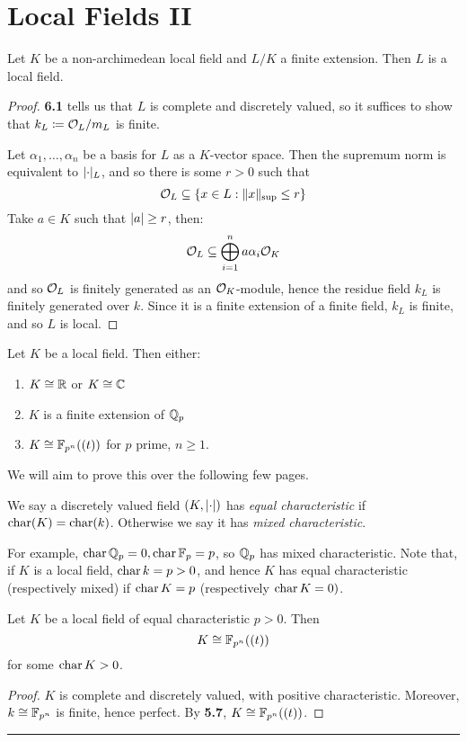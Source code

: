 \documentclass[10pt,a4paper]{article}
\begin{document}
\section{Local Fields II}
\begin{lemma}
  Let $K$ be a non-archimedean local field and $L/K$ a finite extension. Then $L$ is a local field.
\end{lemma}
\begin{proof}
  \textbf{6.1} tells us that $L$ is complete and discretely valued, so it suffices to show that $k_L \coloneqq \mathcal{O}_L/m_L$ is finite.

  Let $\alpha_1, \ldots, \alpha_n$ be a basis for $L$ as a $K$-vector space. Then the supremum norm is equivalent to $\lvert\cdot\rvert_L$, and so there is some $r>0$ such that
  \[ \mathcal{O}_L \subseteq \{x \in L : \lVert x\rVert_{\sup}\leq r\}\]
  Take $a \in K$ such that $\lvert a\rvert\geq r$, then:
  \[ \mathcal{O}_L\subseteq \bigoplus_{i=1}^n a\alpha_i \mathcal{O}_K\]
  and so $\mathcal{O}_L$ is finitely generated as an $\mathcal{O}_K$-module, hence the residue field $k_L$ is finitely generated over $k$. Since it is a finite extension of a finite field, $k_L$ is finite, and so $L$ is local.
\end{proof}

\begin{theorem}
  Let $K$ be a local field. Then either:
  \begin{enumerate}
    \item $K \cong \mathbb{R}$ or $K \cong \mathbb{C}$
    \item $K$ is a finite extension of $\mathbb{Q}_p$
    \item $K \cong \mathbb{F}_{p^n}((t))$ for $p$ prime, $n\geq1$.
  \end{enumerate}
\end{theorem}
We will aim to prove this over the following few pages.
\begin{definition}
  We say a discretely valued field $(K, \lvert\cdot\rvert)$ has \emph{equal characteristic} if $\operatorname{char} (K) = \operatorname{char} (k)$. Otherwise we say it has \emph{mixed characteristic}.
\end{definition}

For example, $\operatorname{char} \mathbb{Q}_p = 0, \operatorname{char} \mathbb{F}_p = p$, so $\mathbb{Q}_p$ has mixed characteristic. Note that, if $K$ is a local field, $\operatorname{char} k = p > 0$, and hence $K$ has equal characteristic (respectively mixed) if $\operatorname{char} K = p$ (respectively $\operatorname{char} K = 0)$.
\begin{theorem}
  Let $K$ be a local field of equal characteristic $p>0$. Then
  \[K \cong \mathbb{F}_{p^n}((t))\]
  for some $\operatorname{char} K > 0$.
\end{theorem}
\begin{proof}
  $K$ is complete and discretely valued, with positive characteristic. Moreover, $k \cong \mathbb{F}_{p^n}$ is finite, hence perfect. By \textbf{5.7}, $K \cong \mathbb{F}_{p^n}((t))$.
\end{proof}
\hrule
\end{document}
